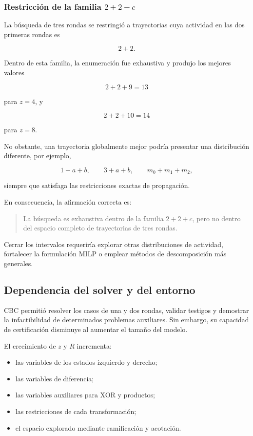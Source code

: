 \subsubsection{Restricción de la familia \texorpdfstring{$2+2+c$}{2+2+c}}

La búsqueda de tres rondas se restringió a trayectorias cuya actividad en
las dos primeras rondas es

\[
2+2.
\]

Dentro de esta familia, la enumeración fue exhaustiva y produjo los mejores
valores

\[
2+2+9=13
\]

para $z=4$, y

\[
2+2+10=14
\]

para $z=8$.

No obstante, una trayectoria globalmente mejor podría presentar una
distribución diferente, por ejemplo,

\[
1+a+b,
\qquad
3+a+b,
\qquad
m_0+m_1+m_2,
\]

siempre que satisfaga las restricciones exactas de propagación.

En consecuencia, la afirmación correcta es:

\begin{quote}
La búsqueda es exhaustiva dentro de la familia $2+2+c$, pero no dentro
del espacio completo de trayectorias de tres rondas.
\end{quote}

Cerrar los intervalos requeriría explorar otras distribuciones de actividad,
fortalecer la formulación MILP o emplear métodos de descomposición más
generales.


\subsection{Dependencia del solver y del entorno}
\label{subsec:dependencia_solver_entorno}

CBC permitió resolver los casos de una y dos rondas, validar testigos y
demostrar la infactibilidad de determinados problemas auxiliares. Sin
embargo, su capacidad de certificación disminuye al aumentar el tamaño del
modelo.

El crecimiento de $z$ y $R$ incrementa:

\begin{itemize}
    \item las variables de los estados izquierdo y derecho;
    \item las variables de diferencia;
    \item las variables auxiliares para XOR y productos;
    \item las restricciones de cada transformación;
    \item el espacio explorado mediante ramificación y acotación.
\end{itemize}

